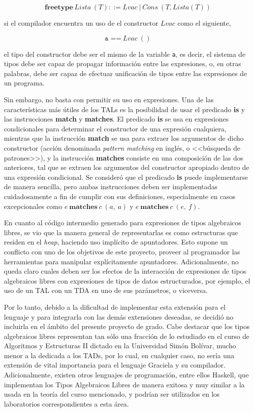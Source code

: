 {{$$ \textbf{freetype}\ Lista\ (T) ::= Lvac\ |\ Cons\ (T, Lista (T)) $$

si el compilador encuentra un uso de el constructor $Lvac$ como el siguiente,

$$ \texttt{a ==}\  Lvac\ () $$

el tipo del constructor debe ser el mismo de la variable \texttt{a}, es decir,
el sistema de tipos debe ser capaz de propagar información entre las
expresiones, o, en otras palabras, debe ser capaz de efectuar unificación de
tipos entre las expresiones de un programa.

Sin embargo, no basta con permitir su uso en expresiones. Una de las
características más útiles de los TALs es la posibilidad de usar el predicado
\textbf{is} y las instrucciones \textbf{match} y \textbf{matches}. El predicado
\textbf{is} se usa en expresiones condicionales para determinar el constructor
de una expresión cualquiera, mientras que la instrucción \textbf{match} se usa
para extraer los argumentos de dicho constructor (acción denominada
\textit{pattern matching} en inglés, o <<búsqueda de patrones>>), y la instrucción
\textbf{matches} consiste en una composición de las dos anteriores, tal que se
extraen los argumentos del constructor apropiado dentro de una expresión
condicional. Se consideró que el predicado \textbf{is} puede implementarse de
manera sencilla, pero ambas instrucciones deben ser implementadas cuidadosamente
a fin de cumplir con sus definiciones, especialmente en casos excepcionales como
$e\ \textbf{matches}\ c\ (a,\ a)$ y $e\ \textbf{matches}\ c\ (e,\ f)$.

En cuanto al código intermedio generado para expresiones de tipos algebraicos
libres, se vio que la manera general de representarlas es como estructuras que
residen en el \emph{heap}, haciendo uso implícito de apuntadores. Esto supone un
conflicto con uno de los objetivos de este proyecto, proveer al programador las
herramientas para manipular explícitamente apuntadores. Adicionalmente, no queda
claro cuales deben ser los efectos de la interacción de expresiones de tipos
algebraicos libres con expresiones de tipos de datos estructurados, por ejemplo,
el uso de un TAL con un TDA en uno de sus parámetros, o viceversa.

Por lo tanto, debido a la dificultad de implementar esta extensión para el
lenguaje y para integrarla con las demás extensiones deseadas, se decidió no
incluirla en el ámbito del presente proyecto de grado. Cabe destacar que los
tipos algebraicos libres representan tan sólo una fracción de lo estudiado en el
curso de Algoritmos y Estructuras II dictado en la Universidad Simón Bolívar,
mucho menor a la dedicada a los TADs, por lo cual, en cualquier caso, no sería
una extensión de vital importancia para el lenguaje Graciela y su compilador.
Adicionalmente, existen otros lenguajes de programación, entre ellos Haskell,
que implementan los Tipos Algebraicos Libres de manera exitosa y muy similar a
la usada en la teoría del curso mencionado, y podrían ser utilizados en los
laboratorios correspondientes a esta área.

}}
